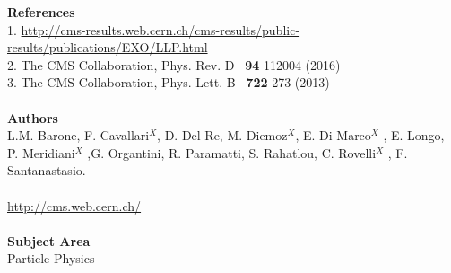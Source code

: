 \documentclass[twocolumn,twoside,10pt,nodate]{article}
\begin{document}


\vfill
\small{
\noindent
\textbf{References}
\\
1. \url{http://cms-results.web.cern.ch/cms-results/public-results/publications/EXO/LLP.html}\\
2. The CMS Collaboration, Phys. Rev. D \ \textbf{94} 112004 (2016) \\
3. The CMS Collaboration, Phys. Lett. B \ \textbf{722} 273 (2013)
\\
\\
\noindent
\textbf{Authors}
\\
L.M. Barone, F. Cavallari$^X$, D. Del Re, M. Diemoz$^X$, E. Di Marco$^X$ , E. Longo, P. Meridiani$^X$ ,G. Organtini, R. Paramatti, S. Rahatlou, C. Rovelli$^X$ , F. Santanastasio.
\\
\\
\url{http://cms.web.cern.ch/}
\\
\\
\noindent
\textbf{Subject Area}
\\
%
%
Particle Physics
%
}
\end{document}
